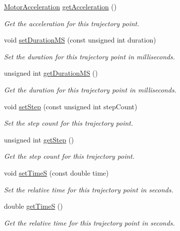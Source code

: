 \begin{DoxyCompactItemize}
\hyperlink{classMotorAcceleration}{Motor\-Acceleration} \hyperlink{classTrajectoryPoint_a237388eb01ab1cc243534e42f1d365f5}{get\-Acceleration} ()
\begin{DoxyCompactList}\small\item\em Get the acceleration for this trajectory point. \end{DoxyCompactList}\item 
void \hyperlink{classTrajectoryPoint_a3f9478e0af994b1fe3258e8c31b1a26a}{set\-Duration\-M\-S} (const unsigned int duration)
\begin{DoxyCompactList}\small\item\em Set the duration for this trajectory point in milliseconds. \end{DoxyCompactList}\item 
unsigned int \hyperlink{classTrajectoryPoint_aae6bd9313448ccbc049891c934b3032d}{get\-Duration\-M\-S} ()
\begin{DoxyCompactList}\small\item\em Get the duration for this trajectory point in milliseconds. \end{DoxyCompactList}\item 
void \hyperlink{classTrajectoryPoint_a3e02eb8dae0e8f27e9f0b3c18043c0eb}{set\-Step} (const unsigned int step\-Count)
\begin{DoxyCompactList}\small\item\em Set the step count for this trajectory point. \end{DoxyCompactList}\item 
unsigned int \hyperlink{classTrajectoryPoint_a296829f5eae5f461d21ba58d7ce9391b}{get\-Step} ()
\begin{DoxyCompactList}\small\item\em Get the step count for this trajectory point. \end{DoxyCompactList}\item 
void \hyperlink{classTrajectoryPoint_a696622132c87b2be1f7dde5985d26dfc}{set\-Time\-S} (const double time)
\begin{DoxyCompactList}\small\item\em Set the relative time for this trajectory point in seconds. \end{DoxyCompactList}\item 
double \hyperlink{classTrajectoryPoint_aa17ef1030899d70b96603f758063a00b}{get\-Time\-S} ()
\begin{DoxyCompactList}\small\item\em Get the relative time for this trajectory point in seconds. \end{DoxyCompactList}\item 

\end{DoxyCompactItemize}
